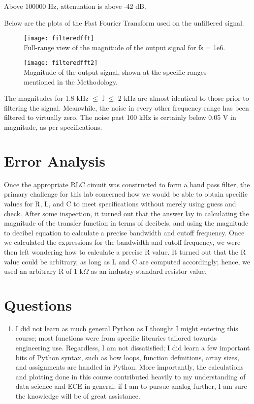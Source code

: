 \documentclass[11pt,a4,titlepage]{article}
\begin{document}
Above 100000 Hz, attenuation is above -42 dB.

Below are the plots of the Fast Fourier Transform used on the unfiltered signal.

\begin{figure}[H]
	\centering
	\texttt{[image: filteredfft]}
	\\ Full-range view of the magnitude of the output signal for fs = 1e6.
\end{figure}

\begin{figure}[H]
	\centering
	\texttt{[image: filteredfft2]}
	\\ Magnitude of the output signal, shown at the specific ranges mentioned in the Methodology.
\end{figure}

The magnitudes for 1.8 kHz $\leq$ f $\leq$ 2 kHz are almost identical to those prior to filtering the signal. Meanwhile, the noise in every other frequency range has been filtered to virtually zero. The noise past 100 kHz is certainly below 0.05 V in magnitude, as per specifications.

\section{Error Analysis}
Once the appropriate RLC circuit was constructed to form a band pass filter, the primary challenge for this lab concerned how we would be able to obtain specific values for R, L, and C to meet specifications without merely using guess and check. After some inspection, it turned out that the answer lay in calculating the magnitude of the transfer function in terms of decibels, and using the magnitude to decibel equation to calculate a precise bandwidth and cutoff frequency. Once we calculated the expressions for the bandwidth and cutoff frequency, we were then left wondering how to calculate a precise R value. It turned out that the R value could be arbitrary, as long as L and C are computed accordingly; hence, we used an arbitrary R of 1 k$\Omega$ as an industry-standard resistor value.

\section{Questions}
\begin{enumerate}
	\item I did not learn as much general Python as I thought I might entering this course; most functions were from specific libraries tailored towards engineering use. Regardless, I am not dissatisfied; I did learn a few important bits of Python syntax, such as how loops, function definitions, array sizes, and assignments are handled in Python. More importantly, the calculations and plotting done in this course contributed heavily to my understanding of data science and ECE in general; if I am to pursue analog further, I am sure the knowledge will be of great assistance.
\end{enumerate}
\end{document}
